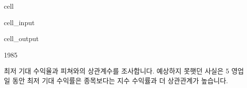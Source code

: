 \documentclass[letterpaper,10pt,english]{jupyterBook}
\begin{document}
\begin{sphinxuseclass}{cell}
\begin{sphinxVerbatimInput}
\begin{sphinxuseclass}{cell_input}
\begin{sphinxVerbatim}[commandchars=\\\{\}]
  \PYG{p}{[}\PYG{p}{[}\PYG{p}{]}    \PYG{p}{[}\PYG{p}{]}  \PYG{p}{]}
\end{sphinxVerbatim}

\end{sphinxuseclass}\end{sphinxVerbatimInput}
\begin{sphinxVerbatimOutput}

\begin{sphinxuseclass}{cell_output}
\begin{sphinxVerbatim}[commandchars=\\\{\}]
1985
\end{sphinxVerbatim}

\end{sphinxuseclass}\end{sphinxVerbatimOutput}

\end{sphinxuseclass}
\sphinxAtStartPar
 최저 기대 수익율과 피쳐와의 상관계수를 조사합니다. 예상하지 못햇던 사실은 5 영업일 동안 최저 기대 수익률은 종목보다는 지수 수익률과 더 상관관계가 높습니다.
\end{document}
